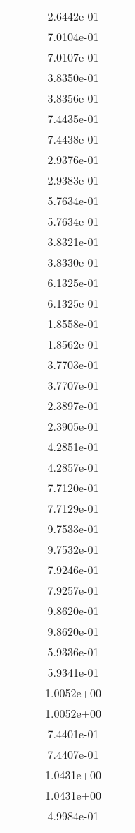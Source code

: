 \begin{xltabular}{\textwidth}{r|rS[table-format=1.3e+2]S[table-format=1.4e+2]S[table-format=1.4e+2]S[table-format=-1.5]}
&  &  & 2.6442e-01 & & \\
&  &  & 7.0104e-01 & & \\
&  &  & 7.0107e-01 & & \\
&  &  & 3.8350e-01 & & \\
&  &  & 3.8356e-01 & & \\
&  &  & 7.4435e-01 & & \\
&  &  & 7.4438e-01 & & \\
&  &  & 2.9376e-01 & & \\
&  &  & 2.9383e-01 & & \\
&  &  & 5.7634e-01 & & \\
&  &  & 5.7634e-01 & & \\
&  &  & 3.8321e-01 & & \\
&  &  & 3.8330e-01 & & \\
&  &  & 6.1325e-01 & & \\
&  &  & 6.1325e-01 & & \\
&  &  & 1.8558e-01 & & \\
&  &  & 1.8562e-01 & & \\
&  &  & 3.7703e-01 & & \\
&  &  & 3.7707e-01 & & \\
&  &  & 2.3897e-01 & & \\
&  &  & 2.3905e-01 & & \\
&  &  & 4.2851e-01 & & \\
&  &  & 4.2857e-01 & & \\
&  &  & 7.7120e-01 & & \\
&  &  & 7.7129e-01 & & \\
&  &  & 9.7533e-01 & & \\
&  &  & 9.7532e-01 & & \\
&  &  & 7.9246e-01 & & \\
&  &  & 7.9257e-01 & & \\
&  &  & 9.8620e-01 & & \\
&  &  & 9.8620e-01 & & \\
&  &  & 5.9336e-01 & & \\
&  &  & 5.9341e-01 & & \\
&  &  & 1.0052e+00 & & \\
&  &  & 1.0052e+00 & & \\
&  &  & 7.4401e-01 & & \\
&  &  & 7.4407e-01 & & \\
&  &  & 1.0431e+00 & & \\
&  &  & 1.0431e+00 & & \\
&  &  & 4.9984e-01 & & \\

\end{xltabular}
